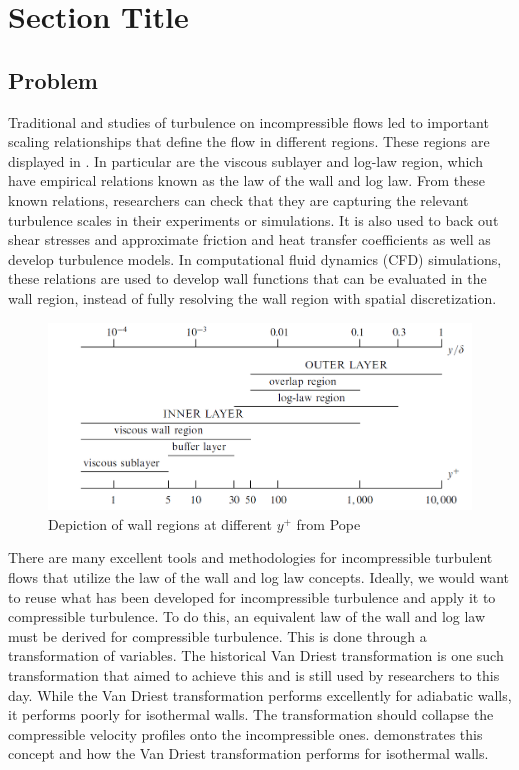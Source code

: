 \section{Section Title}
\subsection{Problem}
Traditional \cite{hasanIntrinsicCompressibilityEffects2025,modestiReynoldsMachNumber2016} and \cite{morkovin1962effects,popeTurbulentFlows2000,trettelMeanVelocityScaling2016} studies of turbulence on incompressible flows led to important scaling relationships that define the flow in different regions. These regions are displayed in . In particular are the viscous sublayer and log-law region, which have empirical relations known as the law of the wall and log law. From these known relations, researchers can check that they are capturing the relevant turbulence scales in their experiments or simulations. It is also used to back out shear stresses and approximate friction and heat transfer coefficients as well as develop turbulence models. In computational fluid dynamics (CFD) simulations, these relations are used to develop wall functions that can be evaluated in the wall region, instead of fully resolving the wall region with spatial discretization.

\begin{figure}[h]
  \centering
  \includegraphics[width=.75\textwidth]{images/wall-regions.png}
  \caption{Depiction of wall regions at different $y^+$ from Pope \cite{popeTurbulentFlows2000}}
  \label{fig:wall-regions}
\end{figure}

There are many excellent tools and methodologies for incompressible turbulent flows that utilize the law of the wall and log law concepts. Ideally, we would want to reuse what has been developed for incompressible turbulence and apply it to compressible turbulence. To do this, an equivalent law of the wall and log law must be derived for compressible turbulence. This is done through a transformation of variables. The historical Van Driest transformation \cite{vandriestTurbulentBoundaryLayer1951} is one such transformation that aimed to achieve this and is still used by researchers to this day. While the Van Driest transformation performs excellently for adiabatic walls, it performs poorly for isothermal walls. The transformation should collapse the compressible velocity profiles onto the incompressible ones.  demonstrates this concept and how the Van Driest transformation performs for isothermal walls.

